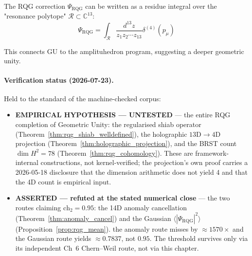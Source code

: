 The RQG correction $\Psi_{\text{RQG}}$ can be written as a residue integral over the "resonance polytope" $\mathcal{R} \subset \mathbb{C}^{13}$:
\begin{equation}
\Psi_{\text{RQG}} = \int_{\mathcal{R}} \frac{d^{13}z}{z_1 z_2 \cdots z_{13}} \delta^{(4)}(p_{\mu})
\end{equation}

This connects GU to the amplituhedron program, suggesting a deeper geometric unity.

\paragraph{Verification status (2026-07-23).}
Held to the standard of the machine-checked corpus:
\begin{itemize}
\item \textbf{EMPIRICAL HYPOTHESIS --- UNTESTED} --- the entire RQG completion of Geometric Unity: the regularised shiab operator (Theorem~\ref{thm:rqg_shiab_welldefined}), the holographic $13\text{D}\to4\text{D}$ projection (Theorem~\ref{thm:holographic_projection}), and the BRST count $\dim H^2=78$ (Theorem~\ref{thm:rqg_cohomology}). These are framework-internal constructions, not kernel-verified; the projection's own proof carries a 2026-05-18 disclosure that the dimension arithmetic does not yield 4 and that the 4D count is empirical input.
\item \textbf{ASSERTED --- refuted at the stated numerical close} --- the two routes claiming $\text{ch}_2=0.95$: the 14D anomaly cancellation (Theorem~\ref{thm:anomaly_cancel}) and the Gaussian $\langle|\Psi_{\text{RQG}}|^2\rangle$ (Proposition~\ref{prop:rqg_mean}). the anomaly route misses by $\approx1570\times$ and the Gaussian route yields $\approx0.7837$, not $0.95$. The threshold survives only via its independent Ch~6 Chern--Weil route, not via this chapter.


\end{itemize}
